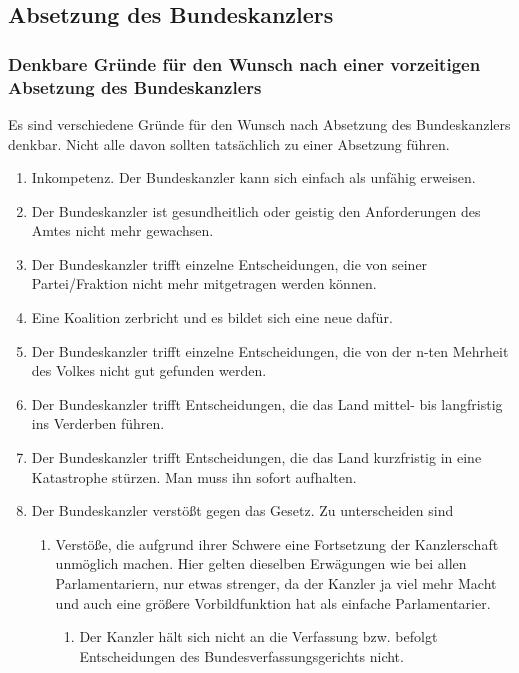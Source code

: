 \subsection{Absetzung des Bundeskanzlers}

\subsubsection{Denkbare Gründe für den Wunsch nach einer vorzeitigen Absetzung des Bundeskanzlers}

Es sind verschiedene Gründe für den Wunsch nach Absetzung des Bundeskanzlers denkbar.
Nicht alle davon sollten tatsächlich zu einer Absetzung führen.

\begin{enumerate}
    \item Inkompetenz. Der Bundeskanzler kann sich einfach als unfähig erweisen.
    \item Der Bundeskanzler ist gesundheitlich oder geistig den Anforderungen des Amtes nicht mehr gewachsen.
    \item Der Bundeskanzler trifft einzelne Entscheidungen, die von seiner Partei/Fraktion nicht mehr mitgetragen werden können.
    \item Eine Koalition zerbricht und es bildet sich eine neue dafür.
    \item Der Bundeskanzler trifft einzelne Entscheidungen, die von der n-ten Mehrheit des Volkes nicht gut gefunden werden.
    \item Der Bundeskanzler trifft Entscheidungen, die das Land mittel- bis langfristig ins Verderben führen.
    \item Der Bundeskanzler trifft Entscheidungen, die das Land kurzfristig in eine Katastrophe stürzen. Man muss ihn sofort aufhalten.
    \item Der Bundeskanzler verstößt gegen das Gesetz.
        Zu unterscheiden sind
        \begin{enumerate}
          \item Verstöße, die aufgrund ihrer Schwere eine Fortsetzung der Kanzlerschaft unmöglich machen. Hier gelten dieselben Erwägungen wie bei allen Parlamentariern, nur etwas strenger, da der Kanzler ja viel mehr Macht und auch eine größere Vorbildfunktion hat als einfache Parlamentarier.
            \begin{enumerate}
                \item Der Kanzler hält sich nicht an die Verfassung bzw. befolgt Entscheidungen des Bundesverfassungsgerichts nicht.

\end{enumerate}
\end{enumerate}
\end{enumerate}

